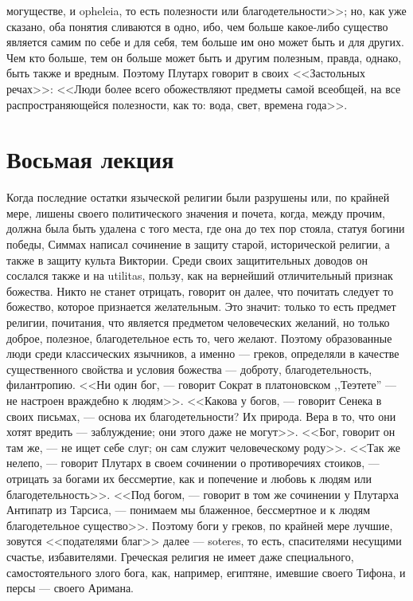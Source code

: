 \documentclass[12pt]{article}
\begin{document}
могуществе, и opheleia, то есть полезности или благодетельности>>; но, как уже сказано, оба понятия сливаются в одно, ибо, чем больше какое-либо существо является самим по себе и для себя, тем больше им оно может быть и для других. Чем кто больше, тем он больше может быть и другим полезным, правда, однако, быть также и вредным. Поэтому Плутарх говорит в своих <<Застольных речах>>: <<Люди более всего обожествляют предметы самой всеобщей, на все распространяющейся полезности, как то: вода, свет, времена года>>. 

{}
\section*{Восьмая лекция}

Когда последние остатки языческой религии были разрушены или, по крайней мере, лишены своего политического значения и почета, когда, между прочим, должна была быть удалена с того места, где она до тех пор стояла, статуя богини победы, Симмах написал сочинение в защиту старой, исторической религии, а также в защиту культа Виктории. Среди своих защитительных доводов он сослался также и на utilitas, пользу, как на вернейший отличительный признак божества. Никто не станет отрицать, говорит он далее, что почитать следует то божество, которое признается желательным. Это значит: только то есть предмет религии, почитания, что является предметом человеческих желаний, но только доброе, полезное, благодетельное есть то, чего желают. Поэтому образованные люди среди классических язычников, а именно --- греков, определяли в качестве существенного свойства и условия божества --- доброту, благодетельность, филантропию. <<Ни один бог, --- говорит Сократ в платоновском ,,Теэтете''  --- не настроен враждебно к людям>>. <<Какова у богов, --- говорит Сенека в своих письмах, --- основа их благодетельности? Их природа. Вера в то, что они хотят вредить --- заблуждение; они этого даже не могут>>. <<Бог, говорит он там же, --- не ищет себе слуг; он сам служит человеческому роду>>. <<Так же нелепо, --- говорит Плутарх в своем сочинении о противоречиях стоиков, --- отрицать за богами их бессмертие, как и попечение и любовь к людям или благодетельность>>. <<Под богом, --- говорит в том же сочинении у Плутарха Антипатр из Тарсиса, --- понимаем мы блаженное, бессмертное и к людям благодетельное существо>>. Поэтому боги у греков, по крайней мере лучшие, зовутся <<подателями благ>>  далее --- soteres, то есть, спасителями несущими счастье, избавителями. Греческая религия не имеет даже специального, самостоятельного злого бога, как, например, египтяне, имевшие своего Тифона, и персы --- своего Аримана. 
\end{document}
